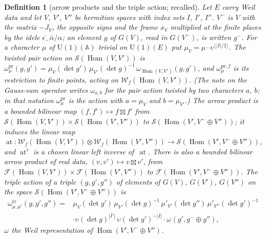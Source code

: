 \documentclass[11pt,a4paper]{article}
\newcommand{\Hom}{\operatorname{Hom}}
\newcommand{\kw}[1]{\emph{#1}}
\newcommand{\m}[1]{\mbox{$#1$}}        %
\theoremstyle{plainx}
\theoremstyle{uprightx}
\newtheorem{definition}[theorem]{Definition}
\newcommand{\A}{\mathbb{A}}
\newcommand{\cj}[1]{\overline{#1}}
\newcommand{\Sch}[1]{\mathcal{S}(#1)}           %
\newcommand{\Wf}[1]{\mathcal{W}_f(#1)}          %
\newcommand{\om}[1]{\omega_{#1}}                %
\newcommand{\Hm}[2]{\Hom(#1,#2)}
\newcommand{\fls}[2]{#1^{-}\oplus #2}           %
\newcommand{\tW}[2]{\omega^{\mathrm{tr}}_{#1,#2}}       %
\newcommand{\pW}[1]{\omega^{\mathrm{pr}}_{#1}}          %
\newcommand{\pWf}[1]{\omega^{\mathrm{pr},f}_{#1}}       %
\newcommand{\at}{\operatorname{at}}
\newcommand{\atl}{\operatorname{at}^{\flat}}
\newcommand{\Gg}[1]{G(#1)}
\newcommand{\epsm}{\epsilon_{-}}                        %
\newcommand{\Fock}[1]{\mathcal{F}(#1)}                  %
\begin{document}
\begin{definition}[arrow products and the triple action; recalled]\label{d:arrowprod}
Let $E$ carry Weil data and let $V$, $V'$, $V''$ be hermitian spaces with index sets $I$, $I'$, $I''$. $V^{-}$ is
$V$ with the matrix $-J_V$, the opposite signs and the frame $x_V$ multiplied at the finite places by the idele
\m{\cj{\epsm}\bar\alpha/\alpha}; an element $g$ of $\Gg{V}$, read in $\Gg{V^{-}}$, is written $g^{-}$. For a character
$\mu$ of $\mathrm{U}(1)(\A)$ trivial on $\mathrm{U}(1)(E)$ put \m{\mu_V=\mu\cdot\upsilon^{\lfloor|I|/2\rfloor}}. The
\kw{twisted pair action} on \m{\Sch{\Hm{V}{V'}}} is
$\pW{\mu}(g,g')=\mu_V(\det g')\,\mu_{V'}(\det g)^{-1}\,\om{\Hm{V}{V'}}(g,g')$, and $\pWf{\mu}$ is its restriction
to finite points, acting on \m{\Wf{\Hm{V}{V'}}}. (The note on the Gauss-sum operator writes $\omega_{a,b}$ for the
pair action twisted by two characters $a$, $b$; in that notation $\pW{\mu}$ is the action with \m{a=\mu_V} and
\m{b=\mu_{V'}}.) The \kw{arrow product} is a bounded bilinear map
\m{(f,f')\mapsto f\boxtimes f'} from \m{\Sch{\Hm{V}{V'}}\times\Sch{\Hm{V'}{V''}}} to \m{\Sch{\Hm{V'}{\fls{V}{V''}}}}; it
induces the linear map $\at\colon\Wf{\Hm{V}{V'}}\otimes\Wf{\Hm{V'}{V''}}\to\Sch{\Hm{V'}{\fls{V}{V''}}}$, and $\atl$ is
a chosen linear left inverse of~$\at$. There is also a bounded bilinear arrow product of real data,
\m{(v,v')\mapsto v\boxtimes v'}, from \m{\Fock{\Hm{V}{V'}}\times\Fock{\Hm{V'}{V''}}} to
\m{\Fock{\Hm{V'}{\fls{V}{V''}}}}. The \kw{triple action} of a triple \m{(g,g',g'')} of elements of $\Gg{V}$,
$\Gg{V'}$, $\Gg{V''}$ on the space \m{\Sch{\Hm{V'}{\fls{V}{V''}}}} is
\[\begin{aligned}
\tW{\mu}{\mu'}(g,g',g'')={}&\mu_V(\det g')\,\mu_{V'}(\det g)^{-1}\,\mu'_{V'}(\det g'')\,\mu'_{V''}(\det g')^{-1}\\
&\cdot\upsilon(\det g)^{|I'|}\,\upsilon(\det g')^{-|I|}\cdot\om{}(g',g^{-}\oplus g''),
\end{aligned}\]
$\om{}$ the Weil representation of \m{\Hm{V'}{\fls{V}{V''}}}.
\end{definition}
\end{document}
